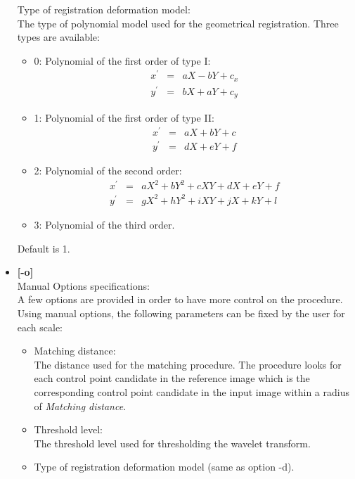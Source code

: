 \begin{itemize}
Type of registration deformation model: \\
The type of polynomial model used for the geometrical registration. Three 
types
are available:
      \begin{itemize}
      \baselineskip=0.4truecm
      \itemsep=0.1truecm
      \item 0: Polynomial of the first order of type I:
            \begin{eqnarray}
            x^{'} & = & aX - bY + c_x \\
            y^{'} & = & bX + aY + c_y 
            \end{eqnarray}
      \item 1: Polynomial of the first order of type II:
            \begin{eqnarray}
             x^{'} & = & aX + bY + c \\
             y^{'} & = & dX + eY + f
            \end{eqnarray}
      \item 2: Polynomial of the second order:
            \begin{eqnarray}
            x^{'} & = & aX^{2} + bY^{2} + cXY + dX + eY + f \\
            y^{'} & = & gX^{2} + hY^{2} + iXY + jX + kY + l 
            \end{eqnarray}
      \item 3: Polynomial of the third order.
      \end{itemize}
Default is 1.
\item{\bf [-o]} \\
Manual Options specifications:\\
A few options are provided in order to have more control on the procedure. 
Using manual options, the following parameters can be fixed by the user 
for each scale:
\begin{itemize}
\baselineskip=0.4truecm
\item Matching distance: \\
      The distance used for the matching procedure. The procedure looks for each control
      point candidate in the reference image which is the corresponding control point
      candidate in the input image within a radius of {\em Matching distance}.
\item Threshold level: \\
      The threshold level used for thresholding the wavelet transform. 
\item Type of registration deformation model (same as option -d).

\end{itemize}
\end{itemize}
